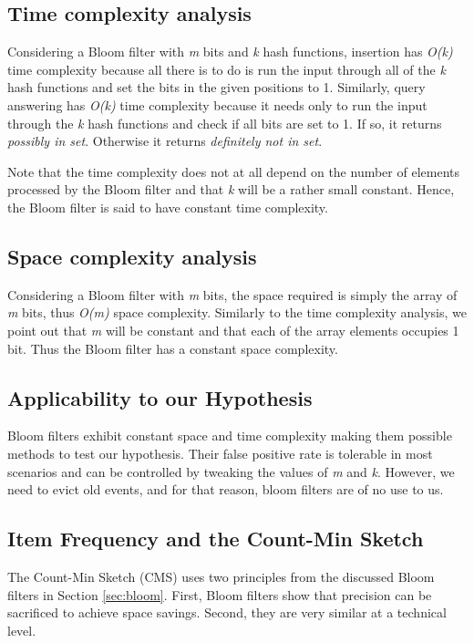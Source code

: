 \subsection*{Time complexity analysis}
Considering a Bloom filter with \textit{m} bits and \textit{k} hash functions, insertion has \textit{O(k)} time complexity because all there is to do is run the input through all of the \textit{k} hash functions and set the bits in the given positions to 1. Similarly, query answering has \textit{O(k)} time complexity because it needs only to run the input through the \textit{k} hash functions and check if all bits are set to 1. If so, it returns \textit{possibly in set}. Otherwise it returns \textit{definitely not in set}. 

Note that the time complexity does not at all depend on the number of elements processed by the Bloom filter and that \textit{k} will be a rather small constant. Hence, the Bloom filter is said to have constant time complexity.

\subsection*{Space complexity analysis}
Considering a Bloom filter with \textit{m} bits, the space required is simply the array of \textit{m} bits, thus \textit{O(m)} space complexity. Similarly to the time complexity analysis, we point out that \textit{m} will be constant and that each of the array elements occupies 1 bit. Thus the Bloom filter has a constant space complexity.

\subsection*{Applicability to our Hypothesis}
Bloom filters exhibit constant space and time complexity making them possible methods to test our hypothesis. Their false positive rate is tolerable in most scenarios and can be controlled by tweaking the values of \textit{m} and \textit{k}. However, we need to evict old events, and for that reason, bloom filters are of no use to us.

\subsection{Item Frequency and the Count-Min Sketch}
The Count-Min Sketch (CMS) uses two principles from the discussed Bloom filters in Section \ref{sec:bloom}. First, Bloom filters show that precision can be sacrificed to achieve space savings. Second, they are very similar at a technical level.

